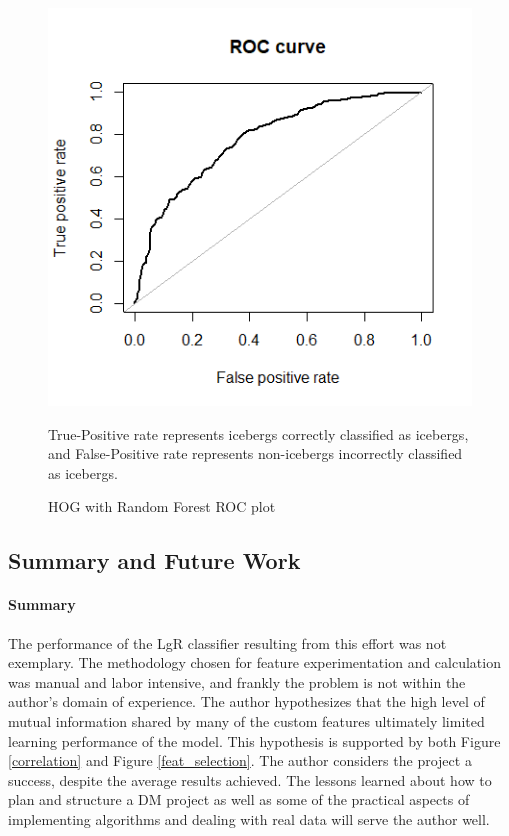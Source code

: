 \documentclass[fleqn,10pt]{SelfArx} %
\begin{document}
\begin{figure}
	\centering
	\includegraphics[width=0.9\linewidth]{iceberg/random_forest.png}
	\caption{HOG with Random Forest ROC plot}\label{roc-hogrf}
	\small
	True-Positive rate represents icebergs correctly classified as icebergs, and False-Positive rate represents non-icebergs incorrectly classified as icebergs.
\end{figure}


\subsection{Summary and Future Work}
\paragraph{Summary}
The performance of the LgR classifier resulting from this effort was not exemplary.  The methodology chosen for feature experimentation and calculation was manual and labor intensive, and frankly the problem is not within the author's domain of experience.  The author hypothesizes that the high level of mutual information shared by many of the custom features ultimately limited learning performance of the model.  This hypothesis is supported by both Figure \ref{correlation} and Figure \ref{feat_selection}.  The author considers the project a success, despite the average results achieved.  The lessons learned about how to plan and structure a DM project as well as some of the practical aspects of implementing algorithms and dealing with real data will serve the author well.
\end{document}
